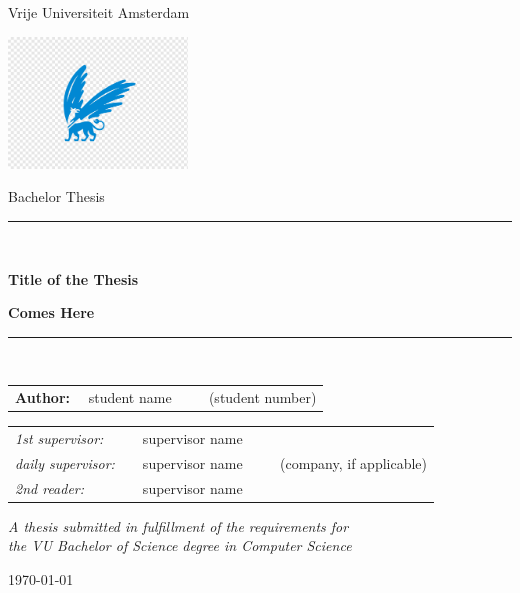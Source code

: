 \documentclass[11pt]{article}
\begin{document}
\thispagestyle{empty}

\begin{center}

Vrije Universiteit Amsterdam

\vspace{1mm}

\includegraphics[height=35mm]{vu.png}

\vspace{1.5cm}

{\Large Bachelor Thesis}

\vspace*{1.5cm}

\rule{.9\linewidth}{.6pt}\\[0.4cm]
{\huge \bfseries Title of the Thesis\par}
{\huge \bfseries Comes Here\par}\vspace{0.4cm}
\rule{.9\linewidth}{.6pt}\\[1.5cm]

\vspace*{2mm}

{\Large
\begin{tabular}{l}
{\bf Author:} ~~student name ~~~~ (student number)
\end{tabular}
}

\vspace*{1.5cm}

\begin{tabular}{ll}
{\it 1st supervisor:}   & ~~supervisor name \\
{\it daily supervisor:} & ~~supervisor name ~~~~ (company, if applicable) \\
{\it 2nd reader:}       & ~~supervisor name
\end{tabular}

\vspace*{2cm}

\textit{A thesis submitted in fulfillment of the requirements for\\ the VU Bachelor of Science degree in Computer Science }

\vspace*{1cm}

\today\\[4cm] %

\end{center}
\end{document}
